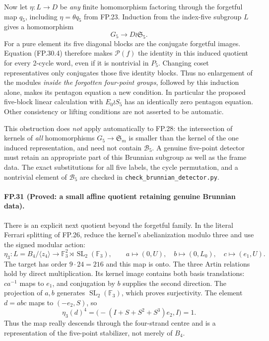 Now let $\eta:L\to D$ be \emph{any} finite homomorphism factoring
through the forgetful map $q_5$, including
$\eta=\theta q_5$ from FP.23. Induction from the index-five subgroup
$L$ gives a homomorphism
\[
 G_5\longrightarrow D\wr\mathfrak S_5.
\]
For a pure element its five diagonal blocks are the conjugate
forgetful images. Equation (FP.30.4) therefore makes
$\mathcal P(f)$ the identity in this induced quotient for every
2-cycle word, even if it is nontrivial in $P_5$. Changing coset
representatives only conjugates those five identity blocks.
Thus no enlargement of the modules \emph{inside the forgotten
four-point groups}, followed by this induction alone, makes its
pentagon equation a new condition. In particular the proposed
five-block linear calculation with $E_0\wr S_5$ has an identically
zero pentagon equation. Other consistency or lifting conditions are
not asserted to be automatic.

This obstruction does \emph{not} apply automatically to FP.28:
the intersection of kernels of \emph{all} homomorphisms
$G_5\to\mathfrak S_m$ is smaller than the kernel of the one induced
representation, and need not contain $\mathcal B_5$. A genuine
five-point detector must retain an appropriate part of this Brunnian
subgroup as well as the frame data. The exact substitutions for all
five labels, the cycle permutation, and a nontrivial element of
$\mathcal B_5$ are checked in
\texttt{check\_brunnian\_detector.py}.

\paragraph{FP.31 (Proved: a small affine quotient retaining genuine Brunnian data).}
There is an explicit next quotient beyond the forgetful family.
In the literal Ferrari splitting of FP.26, reduce the kernel's
abelianization modulo three and use the signed modular action:
\[
 \eta_3:L=B_4/\langle z_4\rangle
       \longrightarrow\mathbb F_3^2\rtimes\operatorname{SL}_2(\mathbb F_3),
 \qquad
 a\longmapsto(0,U),\quad b\longmapsto(0,L_0),\quad
 c\longmapsto(e_1,U).
 \tag{FP.31.1}
\]
The target has order $9\cdot24=216$ and this map is onto.
The three Artin relations hold by direct multiplication.
Its kernel image contains both basis translations: $ca^{-1}$ maps
to $e_1$, and conjugation by $b$ supplies the second direction.
The projection of $a,b$ generates $\operatorname{SL}_2(\mathbb F_3)$,
which proves surjectivity.
The element $d=abc$ maps to $(-e_2,S)$, so
\[
 \eta_3(d)^4=\bigl(-(I+S+S^2+S^3)e_2,I\bigr)=1.
\]
Thus the map really descends through the four-strand centre and is
a representation of the five-point stabilizer, not merely of $B_4$.

